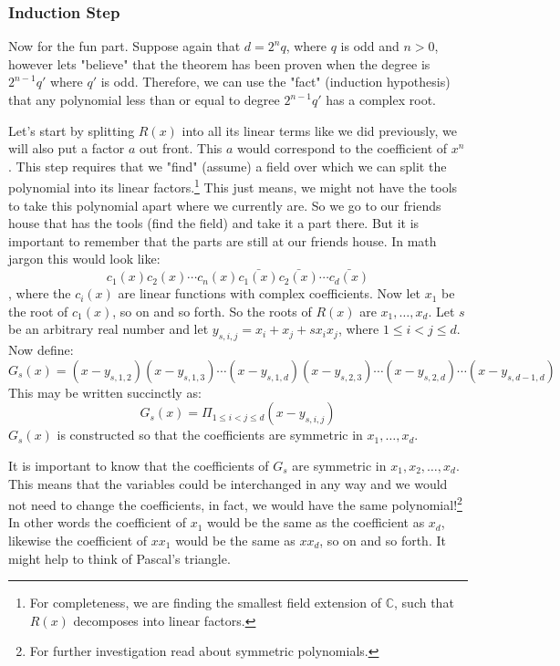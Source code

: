 \documentclass[12pt]{article}
\begin{document}
\subsubsection*{Induction Step}
Now for the fun part.  Suppose again that $d=2^n q$, where $q$ is odd and $n>0$, however lets "believe" that the theorem has been proven when the degree is $2^{n-1}q'$ where $q'$ is odd.  Therefore, we can use the "fact" (induction hypothesis) that any polynomial less than or equal to degree $2^{n-1} q'$ has a complex root.

Let's start by splitting $R(x)$ into all its linear terms like we did previously, we will also put a factor $a$ out front.  This $a$ would correspond to the coefficient of $x^n$.  This step requires that we "find" (assume) a field over which we can split the polynomial into its linear factors.\footnote{For completeness, we are finding the smallest field extension of $\mathbb{C}$, such that $R(x)$ decomposes into linear factors.}  This just means, we might not have the tools to take this polynomial apart where we currently are.  So we go to our friends house that has the tools (find the field) and take it a part there.  But it is important to remember that the parts are still at our friends house.  In math jargon this would look like: \\
$$c_1(x)c_2(x)\cdots c_n(x)\bar{c_1(x)}\bar{c_2(x)}\cdots \bar{c_d(x)}$$, where the $c_i(x)$ are linear functions with complex coefficients.  Now let $x_1$ be the root of $c_1(x)$, so on and so forth.  So the roots of $R(x)$ are $x_1, \ldots, x_d$.  Let $s$ be an arbitrary real number and let $y_{s,i,j} = x_i +x_j + s x_i x_j$, where $1 \leq i < j \leq d$. Now define:
$$ G_s(x) =(x-y_{s,1,2})(x-y_{s,1,3})\cdots(x-y_{s,1,d})(x-y_{s,2,3})\cdots (x-y_{s,2,d})\cdots (x-y_{s,d-1,d})$$
This may be written succinctly as:
$$ G_s(x) = \Pi_{1 \leq i < j \leq d} (x-y_{s,i,j})$$
$G_s(x)$ is constructed so that the coefficients are symmetric in $x_1, \ldots
, x_d$.

It is important to know that the coefficients of $G_s$ are symmetric in $x_1, x_2, \ldots, x_d$.  This means that the variables could be interchanged in any way and we would not need to change the coefficients, in fact, we would have the same polynomial!\footnote{For further investigation read about symmetric polynomials.}  In other words the coefficient of $x_1$ would be the same as the coefficient as $x_d$, likewise the coefficient of $x x_1$ would be the same as $x x_d$, so on and so forth.  It might help to think of Pascal's triangle.
\end{document}
